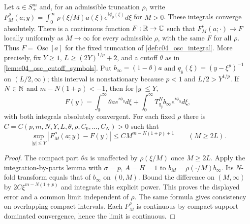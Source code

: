 \begin{lemma}
  \label{lem:c04_osc_cutoff_limit}
  Let $a\in S^m_+$ and, for an admissible truncation $\rho$, write
  $F_M^\rho(a;y)=\int_0^\infty\rho(\xi/M)a(\xi)e^{i\phi_y(\xi)}d\xi$ for $M>0$.
  These integrals converge absolutely. There is a continuous function
  $F:\mathbb{R}\to\mathbb{C}$ such that $F_M^\rho(a;\cdot)\to F$ locally uniformly as
  $M\to\infty$ for every admissible $\rho$, with the same $F$ for all $\rho$.
  Thus $F=\operatorname{Osc}[a]$ for the fixed truncation of \cref{def:c04_osc_integral}.
  More precisely, fix $Y\ge1$, $L\ge(2Y)^{1/p}+2$, and a cutoff $\theta$ as in
  \cref{lem:c04_osc_cutoff_symbols}. Put $b_\infty=(1-\theta)a$ and
  $q_y(\xi)=(y-\xi^p)^{-1}$ on $(L/2,\infty)$; this interval is nonstationary
  because $p<1$ and $L/2>Y^{1/p}$.
  If $N\in\mathbb{N}$ and $m-N(1+p)<-1$, then for $|y|\le Y$,
  \[
    F(y)=\int_0^\infty\theta a e^{i\phi_y}d\xi+
         \int_0^\infty T_{q_y}^Nb_\infty e^{i\phi_y}d\xi,
  \]
  with both integrals absolutely convergent. For each fixed $\rho$ there is
  $C=C(p,m,N,Y,L,\theta,\rho,C_0,\ldots,C_N)>0$ such that
  \[
    \sup_{|y|\le Y}|F_M^\rho(a;y)-F(y)|
       \le C M^{m-N(1+p)+1}\qquad(M\ge2L).
  \]
\end{lemma}
\begin{proof}
  The compact part $\theta a$ is unaffected by $\rho(\xi/M)$ once $M\ge2L$.
  Apply the integration-by-parts lemma with $\sigma=p$, $A=H=1$ to
  $b_M=\rho(\cdot/M)b_\infty$. Its $N$-fold transform equals that of $b_\infty$
  on $(0,M)$. Bound the difference on $(M,\infty)$ by
  $2C\xi^{m-N(1+p)}$ and integrate this explicit power.
  This proves the displayed error and a common limit independent of $\rho$.
  The same formula gives consistency on overlapping compact intervals.
  Each $F_M^\rho$ is continuous by compact-support dominated convergence, hence the limit is continuous.
\end{proof}

